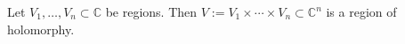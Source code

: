 Let $V_1, \ldots, V_n \subset \mathbb{C}$ be regions. Then $V := V_1 \times \cdots \times V_n \subset \mathbb{C}^n$ is a region of holomorphy.
